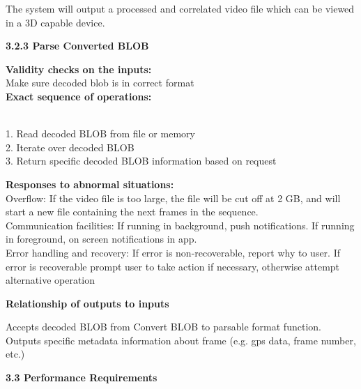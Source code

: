 \documentclass[10pt,draftclsnofoot,onecolumn]{IEEEtran}
\begin{document}
The system will output a processed and correlated video file which can be viewed in a 3D capable device. \\
\vspace{5mm}

{\Medium\textbf{3.2.3 Parse Converted BLOB}} \\
\vspace{5mm}


 \textbf{Validity checks on the inputs:}\\
  \vspace{5mm}
Make sure decoded blob is in correct format\\
 \vspace{5mm}
\textbf{Exact sequence of operations: }\\\\
 \vspace{5mm}

1. Read decoded BLOB from file or memory\\
2. Iterate over decoded BLOB\\
3. Return specific decoded BLOB information based on request\\

 \vspace{5mm}

\textbf{Responses to abnormal situations:}\\
 \vspace{5mm}
 Overflow: If the video file is too large, the file will be cut off at 2 GB, and will start a new file containing the next frames in the sequence. \\
 Communication facilities: If running in background, push notifications. If running in foreground, on screen notifications in app. \\
 Error handling and recovery: If error is non-recoverable, report why to user. If error is recoverable prompt user to take action if necessary, otherwise attempt alternative operation

 \vspace{5mm}
\textbf{Relationship of outputs to inputs }\\
 \vspace{5mm}

Accepts decoded BLOB from Convert BLOB to parsable format function. Outputs specific metadata information about frame (e.g. gps data, frame number, etc.)
 \\\vspace{5mm}


 {\Medium\textbf{3.3 Performance Requirements}} \\
  \\\vspace{5mm}
\end{document}
